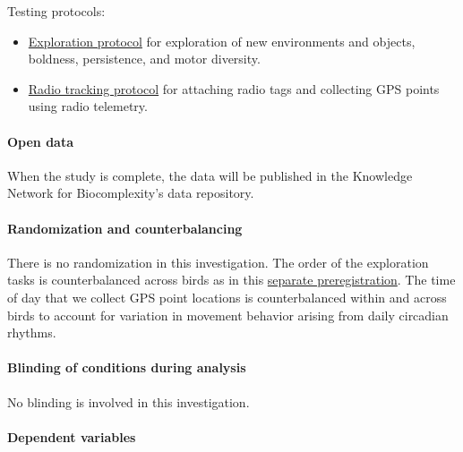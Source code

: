 \documentclass[]{article}
\providecommand{\tightlist}{%
  \setlength{\itemsep}{0pt}\setlength{\parskip}{0pt}}
\let\oldparagraph\paragraph
\renewcommand{\paragraph}[1]{\oldparagraph{#1}\mbox{}}
\begin{document}
Testing protocols:

\begin{itemize}
\tightlist
\item
  \href{https://docs.google.com/document/d/1sEMc5z2fw6S9C-wVfc2zV331CRPpu3NuA7IhSFUZJpE/edit?usp=sharing}{Exploration
  protocol} for exploration of new environments and objects, boldness,
  persistence, and motor diversity.
\item
  \href{https://docs.google.com/document/d/1jtjgeWJoZ0Q1CfUpV6zdkyQL3p3WfW9KgyLrMNmNMJc/edit?usp=sharing}{Radio
  tracking protocol} for attaching radio tags and collecting GPS points
  using radio telemetry.
\end{itemize}

\paragraph{\texorpdfstring{\textbf{Open
data}}{Open data}}\label{open-data}

When the study is complete, the data will be published in the Knowledge
Network for Biocomplexity's data repository.

\paragraph{\texorpdfstring{\textbf{Randomization and
counterbalancing}}{Randomization and counterbalancing}}\label{randomization-and-counterbalancing}

There is no randomization in this investigation. The order of the
exploration tasks is counterbalanced across birds as in this
\href{http://corinalogan.com/Preregistrations/g_exploration.html}{separate
preregistration}. The time of day that we collect GPS point locations is
counterbalanced within and across birds to account for variation in
movement behavior arising from daily circadian rhythms.

\paragraph{\texorpdfstring{\textbf{Blinding of conditions during
analysis}}{Blinding of conditions during analysis}}\label{blinding-of-conditions-during-analysis}

No blinding is involved in this investigation.

\paragraph{\texorpdfstring{\textbf{Dependent
variables}}{Dependent variables}}\label{dependent-variables}
\end{document}
